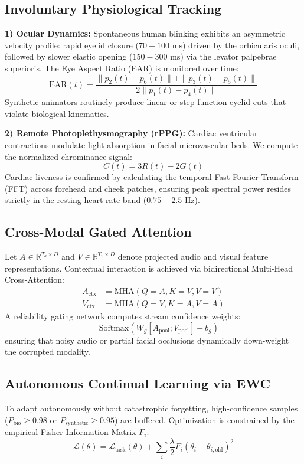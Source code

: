 \documentclass[journal,10pt,twocolumn]{IEEEtran}
\begin{document}
\subsection{Involuntary Physiological Tracking}
\textbf{1) Ocular Dynamics:} Spontaneous human blinking exhibits an asymmetric velocity profile: rapid eyelid closure ($70-100\text{ ms}$) driven by the orbicularis oculi, followed by slower elastic opening ($150-300\text{ ms}$) via the levator palpebrae superioris. The Eye Aspect Ratio (EAR) is monitored over time:
\begin{equation}
\text{EAR}(t) = \frac{\|p_2(t) - p_6(t)\| + \|p_3(t) - p_5(t)\|}{2 \|p_1(t) - p_4(t)\|}
\end{equation}
Synthetic animators routinely produce linear or step-function eyelid cuts that violate biological kinematics.

\textbf{2) Remote Photoplethysmography (rPPG):} Cardiac ventricular contractions modulate light absorption in facial microvascular beds. We compute the normalized chrominance signal:
\begin{equation}
C(t) = 3 R(t) - 2 G(t)
\end{equation}
Cardiac liveness is confirmed by calculating the temporal Fast Fourier Transform (FFT) across forehead and cheek patches, ensuring peak spectral power resides strictly in the resting heart rate band ($0.75 - 2.5\text{ Hz}$).

\subsection{Cross-Modal Gated Attention}
Let $A \in \mathbb{R}^{T_a \times D}$ and $V \in \mathbb{R}^{T_v \times D}$ denote projected audio and visual feature representations. Contextual interaction is achieved via bidirectional Multi-Head Cross-Attention:
\begin{align}
A_{\text{ctx}} &= \text{MHA}(Q=A, K=V, V=V) \\
V_{\text{ctx}} &= \text{MHA}(Q=V, K=A, V=A)
\end{align}
A reliability gating network computes stream confidence weights:
\begin{equation}
[w_a, w_v] = \text{Softmax}\left(W_g [A_{\text{pool}}; V_{\text{pool}}] + b_g\right)
\end{equation}
ensuring that noisy audio or partial facial occlusions dynamically down-weight the corrupted modality.

\subsection{Autonomous Continual Learning via EWC}
To adapt autonomously without catastrophic forgetting, high-confidence samples ($P_{\text{bio}} \ge 0.98$ or $P_{\text{synthetic}} \ge 0.95$) are buffered. Optimization is constrained by the empirical Fisher Information Matrix $F_i$:
\begin{equation}
\mathcal{L}(\theta) = \mathcal{L}_{\text{task}}(\theta) + \sum_{i} \frac{\lambda}{2} F_i (\theta_i - \theta_{i,\text{old}})^2
\end{equation}
\end{document}
